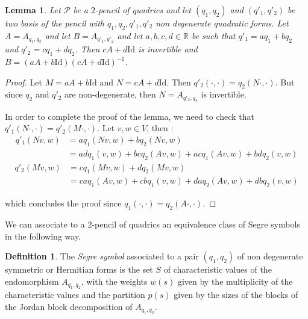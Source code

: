 \documentclass[reqno,10pt]{amsart}
\theoremstyle{plain}
\newtheorem{lem}[thm]{Lemma}
\theoremstyle{definition}
\newtheorem{defn}[thm]{Definition}
\theoremstyle{remark}
\newcommand{\Id}{\text{Id}}
\begin{document}
\begin{lem}

\label{lem:PSL2ActionPencilBasis}
Let $\mathcal{P}$ be a $2$-pencil of quadrics and let $(q_1,q_2)$ and $(q'_1,q'_2)$ be two basis of the pencil with $q_1,q_2,q'_1,q'_2$ non degenerate quadratic forms. Let $A=A_{q_1,q_2}$ and let $B=A_{q'_1,q'_2}$  and let $a,b,c,d\in \mathbb{R}$ be such that $q'_1=aq_1+bq_2$ and $q'_2=cq_1+dq_2$. Then $cA+d\text{Id}$ is invertible and $B=(aA+b\text{Id})(cA+d\text{Id})^{-1}$.
\end{lem}

\begin{proof}

Let  $M=aA+b\text{Id}$ and $N=cA+d\Id$. Then $q'_2(\cdot,\cdot)=q_2(N\cdot,\cdot)$. But since $q_2$ and $q'_2$ are non-degenerate, then $N=A_{q'_2,q_2}$ is invertible.

\medskip

In order to complete the proof of the lemma, we need to check that $q'_1(N\cdot,\cdot)=q'_2(M\cdot,\cdot)$. Let $v,w\in V$, then :
\begin{equation*} 
\begin{split}
q'_1(Nv,w) & = aq_1(Nv,w)+bq_2(Nv,w) \\
 & = adq_1(v,w)+bcq_2(Av,w)+acq_1(Av,w)+bdq_2(v,w)
\end{split}
\end{equation*}
\begin{equation*} 
\begin{split}
q'_2(Mv,w) & = cq_1(Mv,w)+dq_2(Mv,w) \\
 & = caq_1(Av,w)+cbq_1(v,w)+daq_2(Av,w)+dbq_2(v,w)
\end{split}
\end{equation*}

which concludes the proof since $q_1(\cdot,\cdot)=q_2(A\cdot,\cdot)$.
\end{proof}

We can associate to a $2$-pencil of quadrics an equivalence class of Segre symbols in the following way.

\begin{defn}
The \emph{Segre symbol} associated to a pair $(q_1,q_2)$ of non degenerate symmetric or Hermitian forms is the set $S$ of characteristic values of the endomorphism $A_{q_1,q_2}$, with the weights $w(s)$ given by the multiplicity of the characteristic values and the partition $p(s)$ given by the sizes of the blocks of the Jordan block decomposition of $A_{q_1,q_2}$.
\end{defn}
\end{document}
